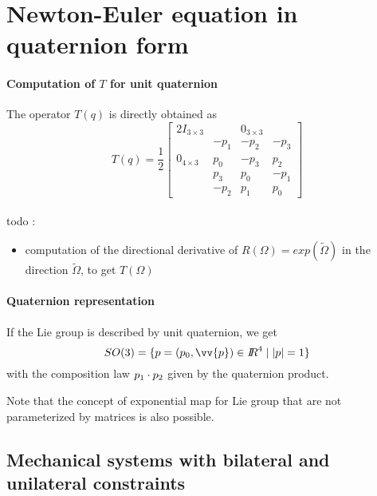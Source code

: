 \section{Newton-Euler equation in quaternion  form}

\paragraph{Computation of $T$ for unit quaternion} The operator $T(q)$ is directly obtained as
\begin{equation}
  T(q)=\frac 1 2 \label{eq:98}
  \begin{bmatrix}
    2 I_{3\times 3} & & 0_{3\times 3} & \\
    &   -p_1 & -p_2 & -p_3 \\
    0_{4\times 3}  &  p_0 & -p_3 & p_2 \\
    & p_3 & p_0 & -p_1 \\
    & -p_2 & p_1 & p_0 
  \end{bmatrix}
\end{equation}

\paragraph{}




\begin{ndrva}
  todo :
  \begin{itemize}
  \item computation of the directional derivative of $R(\Omega)= exp(\tilde \Omega)$ in the direction $\tilde\Omega$, to get $T(\Omega)$  
  \end{itemize}
\end{ndrva}

\paragraph{Quaternion representation}If the Lie group is described by unit quaternion, we get
\begin{equation}
  \label{eq:99}
  SO(3) = \{p = (p_0,\vv{p}) \in \RR^{4}\mid |p|=1  \}
\end{equation}
with the composition law  $p_1\cdot p_2$ given by the quaternion product.



Note that the concept of exponential map for Lie group that are not parameterized by matrices is also possible.


\subsection{Mechanical systems  with bilateral and unilateral constraints}
\label{section22}



